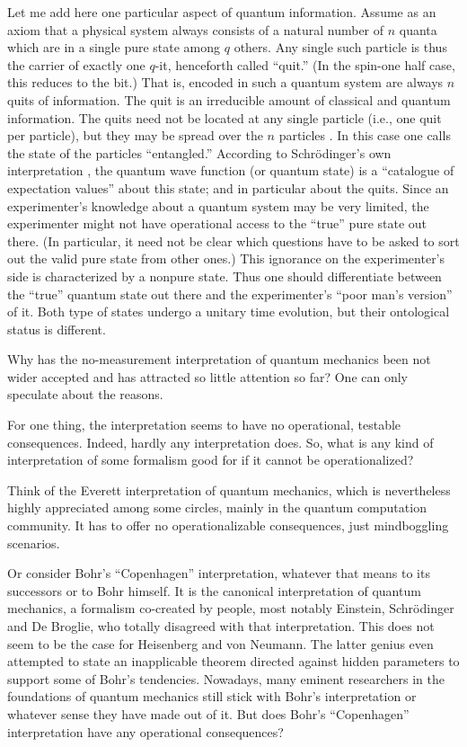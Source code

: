 Let me add here one particular aspect of quantum information.
Assume as an axiom that a physical system always consists of
a natural number of $n$ quanta which are in a single pure state
among $q$ others.
Any single such particle is thus the carrier of
exactly one $q$-it, henceforth called ``quit.''
(In the spin-one half case, this reduces to the bit.)
That is, encoded in such a quantum system are always
$n$ quits of information.
The quit is an irreducible amount of classical and quantum information.
The quits need not be located at any single particle
(i.e., one quit per particle),
but they may be spread over the $n$ particles \cite{DonSvo01}.
In this case one calls the state of the particles ``entangled.''
According to Schr\"odinger's own
interpretation \cite{schrodinger},
the quantum wave function (or quantum state) is a
``catalogue of expectation values''
about this state; and in particular about the quits.
Since an experimenter's knowledge about a quantum system may be very
limited, the experimenter might not have operational access
to the ``true'' pure state out there.
(In particular, it need not be clear which questions have to be asked
to sort out the valid pure state from other ones.)
This ignorance on the experimenter's side is characterized by a nonpure
state.
Thus one should differentiate between the ``true'' quantum state out
there and the experimenter's ``poor man's version'' of it.
Both type of states undergo a unitary time evolution, but their
ontological status is different.


Why has the no-measurement interpretation of quantum mechanics
been not wider accepted and has attracted so little attention so far?
One can only speculate about the reasons.

For one thing, the interpretation seems to have no operational, testable
consequences.
Indeed, hardly any interpretation does.
So, what is any kind of interpretation of some formalism good for if
it cannot be operationalized?


Think of the Everett interpretation of quantum mechanics, which is
nevertheless highly appreciated among some circles, mainly in the
quantum computation community.
It has to offer no operationalizable consequences, just mindboggling
scenarios.

Or consider Bohr's ``Copenhagen'' interpretation, whatever that means to
its successors or to Bohr himself.
It is the canonical interpretation of  quantum mechanics,
a formalism
co-created by people, most notably  Einstein, Schr\"odinger and De
Broglie, who totally disagreed with that interpretation.
This does not seem to be the case for Heisenberg and von
Neumann. The latter genius  even
attempted to state an inapplicable theorem directed against hidden
parameters to support some of Bohr's tendencies.
Nowadays, many eminent researchers in the foundations of quantum
mechanics still stick with Bohr's interpretation or whatever sense
they have made out of it.
But does Bohr's ``Copenhagen'' interpretation have any operational
consequences?


